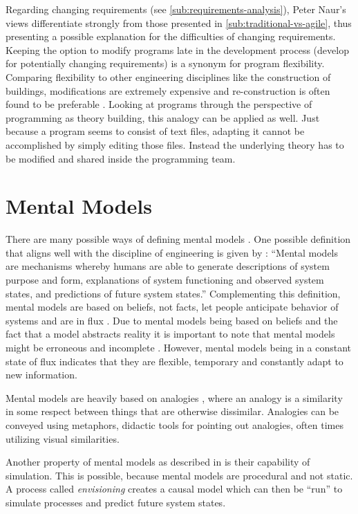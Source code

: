 Regarding changing requirements (see \cref{sub:requirements-analysis}), Peter Naur's views differentiate strongly from those presented in \cref{sub:traditional-vs-agile}, thus presenting a possible explanation for the difficulties of changing requirements.
Keeping the option to modify programs late in the development process (develop for potentially changing requirements) is a synonym for program flexibility.
Comparing flexibility to other engineering disciplines like the construction of buildings, modifications are extremely expensive and re-construction is often found to be preferable \autocite{naur_programming_1985}.
Looking at programs through the perspective of programming as theory building, this analogy can be applied as well.
Just because a program seems to consist of text files, adapting it cannot be accomplished by simply editing those files.
Instead the underlying theory has to be modified and shared inside the programming team.


\section{Mental Models}
\label{sec:mental-models}
There are many possible ways of defining mental models \autocite{herczeg_software-ergonomie_2018}.
One possible definition that aligns well with the discipline of engineering is given by \textcite[7]{rouse_looking_1986}: ``Mental models are mechanisms whereby humans are able to generate descriptions of system purpose and form, explanations of system functioning and observed system states, and predictions of future system states.''
Complementing this definition, mental models are based on beliefs, not facts, let people anticipate behavior of systems and are in flux \autocite{dutke_mentale_1994}.
Due to mental models being based on beliefs and the fact that a model abstracts reality it is important to note that mental models might be erroneous and incomplete \autocite{herczeg_software-ergonomie_2018}.
However, mental models being in a constant state of flux indicates that they are flexible, temporary and constantly adapt to new information.

Mental models are heavily based on analogies \autocite{dutke_mentale_1994}, where an analogy is a similarity in some respect between things that are otherwise dissimilar.
Analogies can be conveyed using metaphors, didactic tools for pointing out analogies, often times utilizing visual similarities.

Another property of mental models as described in \textcite{dutke_mentale_1994} is their capability of simulation.
This is possible, because mental models are procedural and not static.
A process called \emph{envisioning} creates a causal model which can then be ``run'' to simulate processes and predict future system states.

